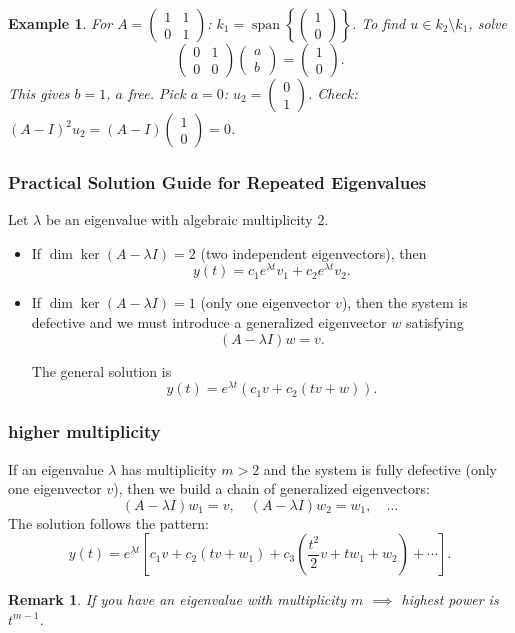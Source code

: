 \documentclass{article}
\newtheorem*{example}{Example}
\newtheorem{remark}{Remark}
\begin{document}
\begin{example}
    For $A = \begin{pmatrix}1&1\\0&1\end{pmatrix}$: 
    $k_1 = \operatorname{span}\!\left\{
    \begin{pmatrix}1\\0\end{pmatrix}\right\}$. To find 
    $u \in k_2 \setminus k_1$, solve
    \[\begin{pmatrix}0&1\\0&0\end{pmatrix}
    \begin{pmatrix}a\\b\end{pmatrix} = 
    \begin{pmatrix}1\\0\end{pmatrix}.\]
    This gives $b=1$, $a$ free. Pick $a=0$: 
    $u_2 = \begin{pmatrix}0\\1\end{pmatrix}$.
    Check: $(A-I)^2 u_2 = (A-I)\begin{pmatrix}1\\0\end{pmatrix} = 0$. 
    \checkmark
\end{example}

\subsubsection{Practical Solution Guide for Repeated Eigenvalues}
Let $\lambda$ be an eigenvalue with algebraic multiplicity $2$.

\begin{itemize}
    \item If $\dim\ker(A - \lambda I) = 2$ (two independent eigenvectors), then
    \[y(t) = c_1 e^{\lambda t} v_1 + c_2 e^{\lambda t} v_2.\]

    \item If $\dim\ker(A - \lambda I) = 1$ (only one eigenvector $v$), then the system is defective and we must introduce a generalized eigenvector $w$ satisfying
    \[(A - \lambda I)w = v.\]

    The general solution is
    \[y(t) = e^{\lambda t}\left( c_1 v + c_2 (t v + w) \right).\]
\end{itemize}
\subsubsection*{higher multiplicity}
If an eigenvalue $\lambda$ has multiplicity $m > 2$ and the system is fully defective (only one eigenvector $v$), then we build a chain of generalized eigenvectors:
\[(A - \lambda I)w_1 = v, \quad (A - \lambda I)w_2 = w_1, \quad \dots\]
The solution follows the pattern:
\[y(t) = e^{\lambda t} \left[c_1 v+ c_2 (t v + w_1)+ c_3 \left(\frac{t^2}{2} v + t w_1 + w_2\right)+ \cdots\right].\]
\begin{remark}
    If you have an eigenvalue with multiplicity $m$ $\implies$ highest power is $t^{m-1}$.
\end{remark}
\end{document}
